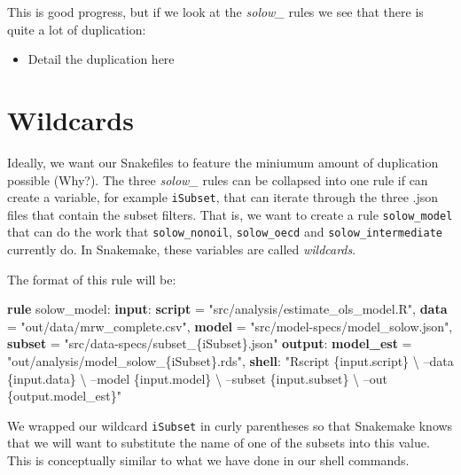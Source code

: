 \documentclass[]{book}
\newenvironment{Shaded}{\begin{snugshade}}{\end{snugshade}}
\newcommand{\KeywordTok}[1]{\textcolor[rgb]{0.13,0.29,0.53}{\textbf{{#1}}}}
\newcommand{\StringTok}[1]{\textcolor[rgb]{0.31,0.60,0.02}{{#1}}}
\newcommand{\NormalTok}[1]{{#1}}
\providecommand{\tightlist}{%
  \setlength{\itemsep}{0pt}\setlength{\parskip}{0pt}}
\theoremstyle{definition}
\theoremstyle{definition}
\theoremstyle{definition}
\theoremstyle{remark}
\begin{document}
This is good progress, but if we look at the \emph{solow\_} rules we see
that there is quite a lot of duplication:

\begin{itemize}
\tightlist
\item
  Detail the duplication here
\end{itemize}

\section{Wildcards}\label{wildcards}

Ideally, we want our Snakefiles to feature the miniumum amount of
duplication possible (Why?). The three \emph{solow\_} rules can be
collapsed into one rule if can create a variable, for example
\texttt{iSubset}, that can iterate through the three .json files that
contain the subset filters. That is, we want to create a rule
\texttt{solow\_model} that can do the work that \texttt{solow\_nonoil},
\texttt{solow\_oecd} and \texttt{solow\_intermediate} currently do. In
Snakemake, these variables are called \emph{wildcards}.

The format of this rule will be:

\begin{Shaded}
\begin{Highlighting}[]
\KeywordTok{rule} \NormalTok{solow_model:}
    \KeywordTok{input}\NormalTok{:}
        \KeywordTok{script} \NormalTok{= }\StringTok{"src/analysis/estimate_ols_model.R"}\NormalTok{,}
        \KeywordTok{data}   \NormalTok{= }\StringTok{"out/data/mrw_complete.csv"}\NormalTok{,}
        \KeywordTok{model}  \NormalTok{= }\StringTok{"src/model-specs/model_solow.json"}\NormalTok{,}
        \KeywordTok{subset} \NormalTok{= }\StringTok{"src/data-specs/subset_\{iSubset\}.json"}
    \KeywordTok{output}\NormalTok{:}
        \KeywordTok{model_est} \NormalTok{= }\StringTok{"out/analysis/model_solow_\{iSubset\}.rds"}\NormalTok{,}
    \KeywordTok{shell}\NormalTok{:}
        \StringTok{"Rscript \{input.script\} \textbackslash{}}
\StringTok{            --data \{input.data\} \textbackslash{}}
\StringTok{            --model \{input.model\} \textbackslash{}}
\StringTok{            --subset \{input.subset\} \textbackslash{}}
\StringTok{            --out \{output.model_est\}"}
\end{Highlighting}
\end{Shaded}

We wrapped our wildcard \texttt{iSubset} in curly parentheses so that
Snakemake knows that we will want to substitute the name of one of the
subsets into this value. This is conceptually similar to what we have
done in our shell commands.
\end{document}
